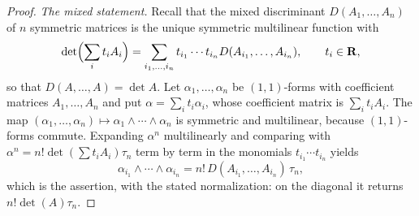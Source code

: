 \begin{proof}
\emph{The mixed statement.}  Recall that the mixed discriminant
$D(A_1,\ldots,A_n)$ of $n$ symmetric matrices is the unique symmetric
multilinear function with
\[
 \det\Bigl(\sum_{i}t_iA_i\Bigr)
 =\sum_{i_1,\ldots,i_n}t_{i_1}\cdots t_{i_n}D(A_{i_1},\ldots,A_{i_n}),
 \qquad t_i\in\mathbf R,
\]
so that $D(A,\ldots,A)=\det A$.  Let $\alpha_1,\ldots,\alpha_n$ be
$(1,1)$-forms with coefficient matrices $A_1,\ldots,A_n$ and put
$\alpha=\sum_it_i\alpha_i$, whose coefficient matrix is $\sum_it_iA_i$.  The
map $(\alpha_1,\ldots,\alpha_n)\mapsto\alpha_1\wedge\cdots\wedge\alpha_n$ is
symmetric and multilinear, because $(1,1)$-forms commute.  Expanding
$\alpha^n$ multilinearly and comparing with
$\alpha^n=n!\det(\sum t_iA_i)\tau_n$ term by term in the monomials
$t_{i_1}\cdots t_{i_n}$ yields
\[
 \alpha_{i_1}\wedge\cdots\wedge\alpha_{i_n}
 =n!\,D(A_{i_1},\ldots,A_{i_n})\,\tau_n ,
\]
which is the assertion, with the stated normalization: on the diagonal it
returns $n!\det(A)\tau_n$.
\end{proof}

